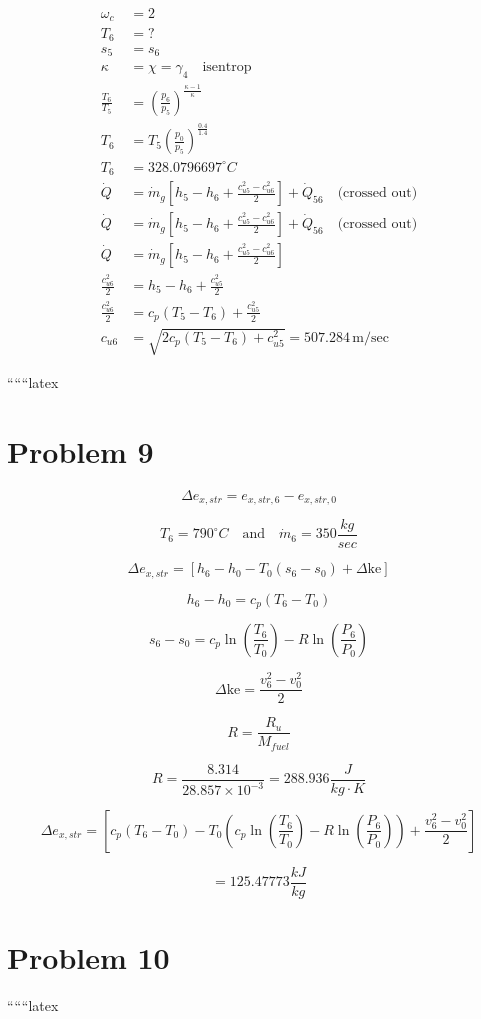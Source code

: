 \begin{align*}
    \omega_c &= 2 \\
    T_6 &= ? \\
    s_5 &= s_6 \\
    \kappa &= \chi = \gamma_4 \quad \text{isentrop} \\
    \frac{T_6}{T_5} &= \left( \frac{p_6}{p_5} \right)^{\frac{\kappa - 1}{\kappa}} \\
    T_6 &= T_5 \left( \frac{p_0}{p_5} \right)^{\frac{0.4}{1.4}} \\
    T_6 &= 328.0796697^\circ C \\
    \dot{Q} &= \dot{m}_g \left[ h_5 - h_6 + \frac{c_{u5}^2 - c_{u6}^2}{2} \right] + \dot{Q}_{56} \quad \text{(crossed out)} \\
    \dot{Q} &= \dot{m}_g \left[ h_5 - h_6 + \frac{c_{u5}^2 - c_{u6}^2}{2} \right] + \dot{Q}_{56} \quad \text{(crossed out)} \\
    \dot{Q} &= \dot{m}_g \left[ h_5 - h_6 + \frac{c_{u5}^2 - c_{u6}^2}{2} \right] \\
    \frac{c_{u6}^2}{2} &= h_5 - h_6 + \frac{c_{u5}^2}{2} \\
    \frac{c_{u6}^2}{2} &= c_p (T_5 - T_6) + \frac{c_{u5}^2}{2} \\
    c_{u6} &= \sqrt{2 c_p (T_5 - T_6) + c_{u5}^2} = 507.284 \, \text{m/sec}
\end{align*}

``````latex


\section*{Problem 9}

\[
\Delta e_{x,str} = e_{x,str,6} - e_{x,str,0}
\]

\[
T_6 = 790^\circ C \quad \text{and} \quad \dot{m}_6 = 350 \frac{kg}{sec}
\]

\[
\Delta e_{x,str} = \left[ h_6 - h_0 - T_0 (s_6 - s_0) + \Delta \text{ke} \right]
\]

\[
h_6 - h_0 = c_p (T_6 - T_0)
\]

\[
s_6 - s_0 = c_p \ln \left( \frac{T_6}{T_0} \right) - R \ln \left( \frac{P_6}{P_0} \right)
\]

\[
\Delta \text{ke} = \frac{v_6^2 - v_0^2}{2}
\]

\[
R = \frac{R_u}{M_{fuel}}
\]

\[
R = \frac{8.314}{28.857 \times 10^{-3}} = 288.936 \frac{J}{kg \cdot K}
\]

\[
\Delta e_{x,str} = \left[ c_p (T_6 - T_0) - T_0 \left( c_p \ln \left( \frac{T_6}{T_0} \right) - R \ln \left( \frac{P_6}{P_0} \right) \right) + \frac{v_6^2 - v_0^2}{2} \right]
\]

\[
= \boxed{125.47773 \frac{kJ}{kg}}
\]

\section*{Problem 10}

``````latex


